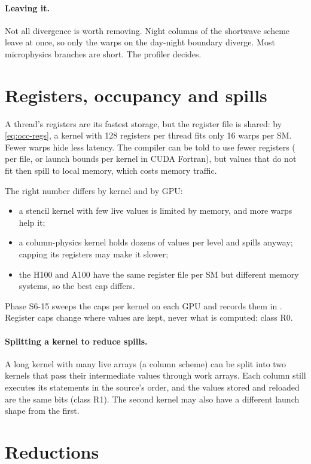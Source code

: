 \paragraph{Leaving it.} Not all divergence is worth removing. Night columns of the shortwave scheme leave at once, so
only the warps on the day-night boundary diverge. Most microphysics branches are short. The profiler decides.

\section{Registers, occupancy and spills}

A thread's registers are its fastest storage, but the register file is shared: by \cref{eq:occ-regs}, a kernel with
128 registers per thread fits only 16 warps per SM. Fewer warps hide less latency. The compiler can be told to use
fewer registers ( per file, or launch bounds per kernel in CUDA Fortran), but values that do
not fit then spill to local memory, which costs memory traffic.

The right number differs by kernel and by GPU:
\begin{itemize}
  \item a stencil kernel with few live values is limited by memory, and more warps help it;
  \item a column-physics kernel holds dozens of values per level and spills anyway; capping its registers may make it
    slower;
  \item the H100 and A100 have the same register file per SM but different memory systems, so the best cap differs.
\end{itemize}
Phase S6-15 sweeps the caps per kernel on each GPU and records them in . Register caps change
where values are kept, never what is computed: class R0.

\paragraph{Splitting a kernel to reduce spills.} A long kernel with many live arrays (a column scheme) can be split into
two kernels that pass their intermediate values through work arrays. Each column still executes its statements in the
source's order, and the values stored and reloaded are the same bits (class R1). The second kernel may also have a
different launch shape from the first.

\section{Reductions}

